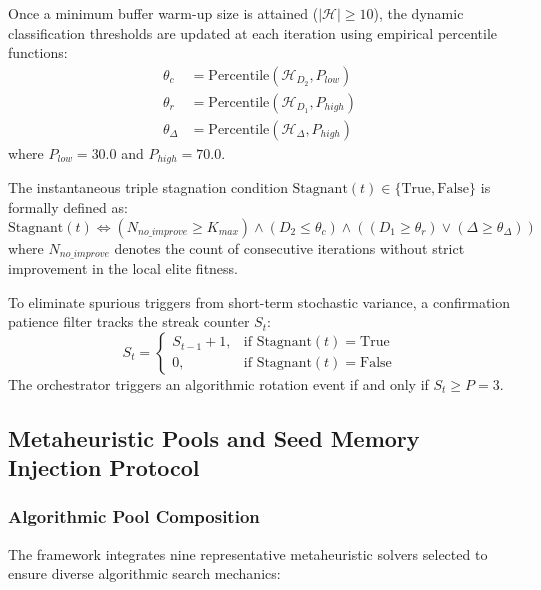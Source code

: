 Once a minimum buffer warm-up size is attained ($|\mathcal{H}| \ge 10$), the dynamic classification thresholds are updated at each iteration using empirical percentile functions:
\begin{align}
\theta_c &= \text{Percentile}\left(\mathcal{H}_{D_2}, P_{low}\right) \label{eq:theta_c} \\
\theta_r &= \text{Percentile}\left(\mathcal{H}_{D_1}, P_{high}\right) \label{eq:theta_r} \\
\theta_\Delta &= \text{Percentile}\left(\mathcal{H}_{\Delta}, P_{high}\right) \label{eq:theta_delta}
\end{align}
where $P_{low} = 30.0$ and $P_{high} = 70.0$.

The instantaneous triple stagnation condition $\text{Stagnant}(t) \in \{\text{True}, \text{False}\}$ is formally defined as:
\begin{equation}
\text{Stagnant}(t) \iff \left( N_{no\_improve} \ge K_{max} \right) \land \left( D_2 \le \theta_c \right) \land \left( (D_1 \ge \theta_r) \lor (\Delta \ge \theta_\Delta) \right)
\label{eq:stagnant_condition}
\end{equation}
where $N_{no\_improve}$ denotes the count of consecutive iterations without strict improvement in the local elite fitness.

To eliminate spurious triggers from short-term stochastic variance, a confirmation patience filter tracks the streak counter $S_t$:
\begin{equation}
S_t = \begin{cases}
S_{t-1} + 1, & \text{if } \text{Stagnant}(t) = \text{True} \\
0, & \text{if } \text{Stagnant}(t) = \text{False}
\end{cases}
\label{eq:streak_counter}
\end{equation}
The orchestrator triggers an algorithmic rotation event if and only if $S_t \ge P = 3$.

\subsection{Metaheuristic Pools and Seed Memory Injection Protocol}
\label{sec:metaheuristic_pools}

\subsubsection{Algorithmic Pool Composition}

The framework integrates nine representative metaheuristic solvers selected to ensure diverse algorithmic search mechanics:


